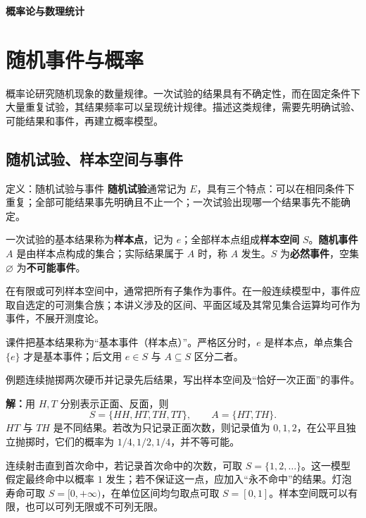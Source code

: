 \documentclass[UTF8,fontset=none,zihao=-4,a4paper]{ctexart}
\newcommand{\term}[1]{\textbf{#1}}
\newcommand{\example}[1]{\begin{infobox}{例题}#1\end{infobox}}
\newcommand{\solution}{\par\noindent\textbf{解：}}
\begin{document}
\begin{titlepage}\thispagestyle{empty}\vspace*{0.28\textheight}
\begin{center}{\fontsize{36}{45}\selectfont\bfseries 概率论与数理统计}\end{center}
\end{titlepage}
\thispagestyle{empty}\tableofcontents
\clearpage{}

\section{随机事件与概率}
概率论研究随机现象的数量规律。一次试验的结果具有不确定性，而在固定条件下大量重复试验，其结果频率可以呈现统计规律。描述这类规律，需要先明确试验、可能结果和事件，再建立概率模型。
\subsection{随机试验、样本空间与事件}
\begin{infobox}{定义：随机试验与事件}
\term{随机试验}通常记为 $E$，具有三个特点：可以在相同条件下重复；全部可能结果事先明确且不止一个；一次试验出现哪一个结果事先不能确定。

一次试验的基本结果称为\term{样本点}，记为 $e$；全部样本点组成\term{样本空间} $S$。\term{随机事件} $A$ 是由样本点构成的集合；实际结果属于 $A$ 时，称 $A$ 发生。$S$ 为\term{必然事件}，空集 $\varnothing$ 为\term{不可能事件}。
\end{infobox}
在有限或可列样本空间中，通常把所有子集作为事件。在一般连续模型中，事件应取自选定的可测集合族；本讲义涉及的区间、平面区域及其常见集合运算均可作为事件，不展开测度论。

课件把基本结果称为“基本事件（样本点）”。严格区分时，$e$ 是样本点，单点集合 $\{e\}$ 才是基本事件；后文用 $e\in S$ 与 $A\subseteq S$ 区分二者。
\example{连续抛掷两次硬币并记录先后结果，写出样本空间及“恰好一次正面”的事件。}
\solution 用 $H,T$ 分别表示正面、反面，则
\[
S=\{HH,HT,TH,TT\},\qquad A=\{HT,TH\}.
\]
$HT$ 与 $TH$ 是不同结果。若改为只记录正面次数，则记录值为 $0,1,2$，在公平且独立抛掷时，它们的概率为 $1/4,1/2,1/4$，并不等可能。

连续射击直到首次命中，若记录首次命中的次数，可取 $S=\{1,2,\ldots\}$。这一模型假定最终命中以概率 $1$ 发生；若不保证这一点，应加入“永不命中”的结果。灯泡寿命可取 $S=[0,+\infty)$，在单位区间均匀取点可取 $S=[0,1]$。样本空间既可以有限，也可以可列无限或不可列无限。
\end{document}
